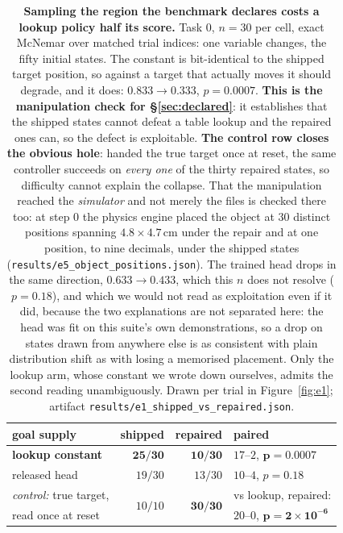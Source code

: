 \documentclass[10pt,twocolumn]{article}
\begin{document}
\begin{table}[h]\centering\footnotesize
\setlength{\tabcolsep}{4pt}
\begin{tabular}{lrrl}
\toprule
goal supply & shipped & repaired & paired \\
\midrule
\textbf{lookup constant} & $\mathbf{25/30}$ & $\mathbf{10/30}$ &
$17$--$2$, $\mathbf{p = 0.0007}$ \\
released head & $19/30$ & $13/30$ & $10$--$4$, $p = 0.18$ \\
\midrule
\emph{control:} true target, & \multirow{2}{*}{$10/10$} &
\multirow{2}{*}{$\mathbf{30/30}$} & vs lookup, repaired: \\
read once at reset & & & $20$--$0$, $\mathbf{p = 2\times10^{-6}}$ \\
\bottomrule
\end{tabular}
\caption{\textbf{Sampling the region the benchmark declares costs a lookup
policy half its score.} Task $0$, $n{=}30$ per cell, exact McNemar over matched
trial indices: one variable changes, the fifty initial states. The constant
is bit-identical to the shipped target position, so against a target that
actually moves it should degrade, and it does: $0.833 \to 0.333$,
$p = 0.0007$. \textbf{This is the manipulation check for
\S\ref{sec:declared}}: it establishes that the shipped states cannot defeat a
table lookup and the repaired ones can, so the defect is exploitable. \textbf{The control row closes the obvious hole}: handed the true
target once at reset, the same controller succeeds on \emph{every one} of the
thirty repaired states, so difficulty cannot explain the collapse. That the manipulation reached the \emph{simulator} and not
merely the files is checked there too: at step $0$ the physics engine placed
the object at $30$ distinct positions spanning $4.8\times4.7$\,cm under the
repair and at one position, to nine decimals, under the shipped states
(\texttt{results/e5\_object\_positions.json}). The trained head drops in the same direction, $0.633 \to
0.433$,
which this $n$ does not resolve ($p = 0.18$), and which we would not read as
exploitation even if it did, because the two explanations are not separated
here: the head was fit on this suite's own demonstrations, so a drop on states
drawn from anywhere else is as consistent with plain distribution shift as with
losing a memorised placement. Only the lookup arm, whose constant we wrote down
ourselves, admits the second reading unambiguously. Drawn per trial in
Figure~\ref{fig:e1}; artifact \texttt{results/e1\_shipped\_vs\_repaired.json}.}
\label{tab:e1}
\end{table}
\end{document}
